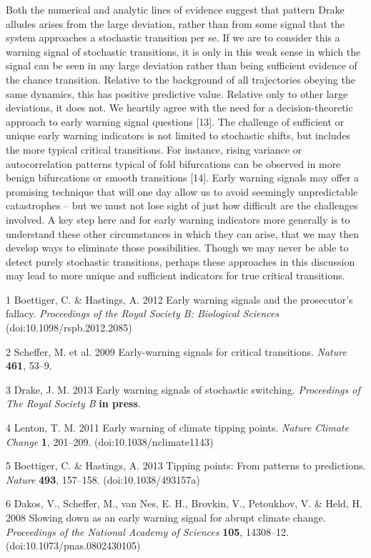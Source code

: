 \documentclass[review]{elsarticle} %
\begin{document}
Both the numerical and analytic lines of evidence suggest that pattern
Drake alludes arises from the large deviation, rather than from some
signal that the system approaches a stochastic transition per se. If we
are to consider this a warning signal of stochastic transitions, it is
only in this weak sense in which the signal can be seen in any large
deviation rather than being sufficient evidence of the chance
transition. Relative to the background of all trajectories obeying the
same dynamics, this has positive predictive value. Relative only to
other large deviations, it does not. We heartily agree with the need for
a decision-theoretic approach to early warning signal questions
{[}13{]}. The challenge of sufficient or unique early warning indicators
is not limited to stochastic shifts, but includes the more typical
critical transitions. For instance, rising variance or autocorrelation
patterns typical of fold bifurcations can be observed in more benign
bifurcations or smooth transitions {[}14{]}. Early warning signals may
offer a promising technique that will one day allow us to avoid
seemingly unpredictable catastrophes -- but we must not lose sight of
just how difficult are the challenges involved. A key step here and for
early warning indicators more generally is to understand these other
circumstances in which they can arise, that we may then develop ways to
eliminate those possibilities. Though we may never be able to detect
purely stochastic transitions, perhaps these approaches in this
discussion may lead to more unique and sufficient indicators for true
critical transitions.

1 Boettiger, C. \& Hastings, A. 2012 Early warning signals and the
prosecutor's fallacy. \emph{Proceedings of the Royal Society B:
Biological Sciences} (doi:10.1098/rspb.2012.2085)

2 Scheffer, M. et al. 2009 Early-warning signals for critical
transitions. \emph{Nature} \textbf{461}, 53--9.

3 Drake, J. M. 2013 Early warning signals of stochastic switching.
\emph{Proceedings of The Royal Society B} \textbf{in press}.

4 Lenton, T. M. 2011 Early warning of climate tipping points.
\emph{Nature Climate Change} \textbf{1}, 201--209.
(doi:10.1038/nclimate1143)

5 Boettiger, C. \& Hastings, A. 2013 Tipping points: From patterns to
predictions. \emph{Nature} \textbf{493}, 157--158. (doi:10.1038/493157a)

6 Dakos, V., Scheffer, M., van Nes, E. H., Brovkin, V., Petoukhov, V. \&
Held, H. 2008 Slowing down as an early warning signal for abrupt climate
change. \emph{Proceedings of the National Academy of Sciences}
\textbf{105}, 14308--12. (doi:10.1073/pnas.0802430105)
\end{document}
